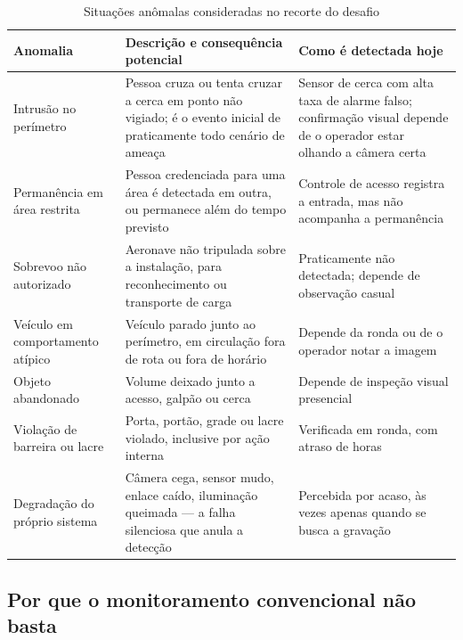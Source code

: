 \documentclass[12pt,a4paper,oneside]{article}
\newcommand{\fonte}[1]{\par\vspace{5pt}{\footnotesize\singlespacing Fonte: #1\par}}
\newcommand{\cab}[1]{\textbf{\footnotesize #1}}
\begin{document}
\begin{table}[H]
\centering
\caption{Situações anômalas consideradas no recorte do desafio}
\label{tab:anomalias}
{\small\singlespacing
\begin{tabularx}{\textwidth}{L{3.3cm} X L{3.5cm}}
\toprule
\cab{Anomalia} & \cab{Descrição e consequência potencial} & \cab{Como é
detectada hoje} \\
\midrule
Intrusão no perímetro & Pessoa cruza ou tenta cruzar a cerca em ponto não
vigiado; é o evento inicial de praticamente todo cenário de ameaça &
Sensor de cerca com alta taxa de alarme falso; confirmação visual depende de o
operador estar olhando a câmera certa \\
\addlinespace
Permanência em área restrita & Pessoa credenciada para uma área é detectada em
outra, ou permanece além do tempo previsto & Controle de acesso registra a
entrada, mas não acompanha a permanência \\
\addlinespace
Sobrevoo não autorizado & Aeronave não tripulada sobre a instalação, para
reconhecimento ou transporte de carga & Praticamente não detectada; depende de
observação casual \\
\addlinespace
Veículo em comportamento atípico & Veículo parado junto ao perímetro, em
circulação fora de rota ou fora de horário & Depende da ronda ou de o operador
notar a imagem \\
\addlinespace
Objeto abandonado & Volume deixado junto a acesso, galpão ou cerca & Depende de
inspeção visual presencial \\
\addlinespace
Violação de barreira ou lacre & Porta, portão, grade ou lacre violado,
inclusive por ação interna & Verificada em ronda, com atraso de horas \\
\addlinespace
Degradação do próprio sistema & Câmera cega, sensor mudo, enlace caído,
iluminação queimada — a falha silenciosa que anula a detecção & Percebida por
acaso, às vezes apenas quando se busca a gravação \\
\bottomrule
\end{tabularx}}
\fonte{elaborado pelos autores (2026), com base nas funções de proteção física
descritas na CNEN NN 2.01 (2019) e na INFCIRC/225/Rev.5 (2011).}
\end{table}

\subsection{Por que o monitoramento convencional não basta}
\end{document}
